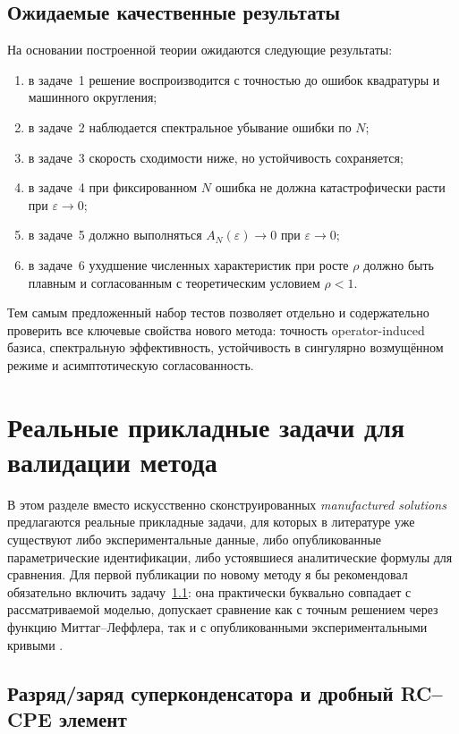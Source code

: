 \documentclass[12pt,a4paper]{article}
\theoremstyle{definition}
\newcommand{\eps}{\varepsilon}
\begin{document}
\subsection{Ожидаемые качественные результаты}

На основании построенной теории ожидаются следующие результаты:
\begin{enumerate}[label=\textup{(\roman*)}]
\item в задаче~1 решение воспроизводится с точностью до ошибок квадратуры и машинного округления;
\item в задаче~2 наблюдается спектральное убывание ошибки по $N$;
\item в задаче~3 скорость сходимости ниже, но устойчивость сохраняется;
\item в задаче~4 при фиксированном $N$ ошибка не должна катастрофически расти при $\eps\to0$;
\item в задаче~5 должно выполняться $A_N(\eps)\to0$ при $\eps\to0$;
\item в задаче~6 ухудшение численных характеристик при росте $\rho$ должно быть плавным
и согласованным с теоретическим условием $\rho<1$.
\end{enumerate}

Тем самым предложенный набор тестов позволяет отдельно и содержательно проверить
все ключевые свойства нового метода:
точность operator-induced базиса, спектральную эффективность, устойчивость
в сингулярно возмущённом режиме и асимптотическую согласованность.

\section{Реальные прикладные задачи для валидации метода}
\label{sec:real-benchmarks}

В этом разделе вместо искусственно сконструированных \emph{manufactured solutions}
предлагаются реальные прикладные задачи, для которых в литературе уже существуют
либо экспериментальные данные, либо опубликованные параметрические идентификации,
либо устоявшиеся аналитические формулы для сравнения.
Для первой публикации по новому методу я бы рекомендовал обязательно включить
задачу~\ref{app:supercap}: она практически буквально совпадает с рассматриваемой
моделью, допускает сравнение как с точным решением через функцию Миттаг--Леффлера,
так и с опубликованными экспериментальными кривыми \cite{gomezaguilar2014rc,lopez2022cpe,kothari2021supercap,wang2020ultracap}.

\subsection{Разряд/заряд суперконденсатора и дробный RC--CPE элемент}
\label{app:supercap}
\end{document}
